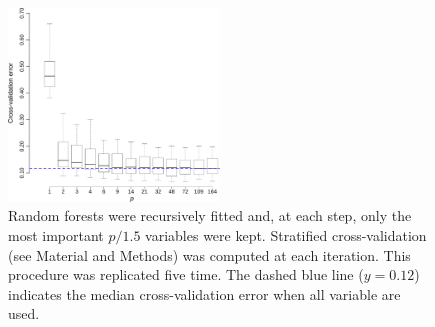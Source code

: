 \begin{figure}[h!]
  \centering    
    \includegraphics[width=0.5\textwidth]{figures/variable_elimination.pdf}
  \caption{
  Random forests were recursively fitted and, at each step, only the most important $p/1.5$ variables were kept.
  Stratified cross-validation (see Material and Methods) was computed at each iteration. This procedure was replicated five time.
  The dashed blue line ($y=0.12$) indicates the median cross-validation error when all variable are used.
  \label{fig:variable_elimination}
  }
\end{figure}
